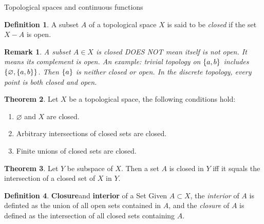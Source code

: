 \documentclass{report}
\let\emptyset\varnothing
\newtheorem*{remark}{Remark}
\theoremstyle{definition}
\newtheorem{theorem}{Theorem}[chapter]
\newtheorem{definition}[theorem]{Definition}
\newcommand{\defn}[1]{\textbf{#1}\label{#1}\index{#1}}
\newcommand{\set}[1]{\ensuremath\left\{#1\right\}}
\begin{document}
\begin{chapter}{Topological spaces and continuous functions}
\begin{definition}
    A subset $A$ of a topological space $X$ is said to be
    \emph{closed} if the set $X-A$ is open.
  \end{definition}
  \begin{remark}
    A subset $A\in X$ is closed DOES NOT mean itself is not open. It
    means its complement is open. An example: trivial topology on
    $\set{a,b}$ includes $\set{\emptyset, \set{a,b}}$. Then $\set{a}$
    is neither closed or open. In the discrete topology, every point
    is both closed and open.
  \end{remark}
  \begin{theorem} Let $X$ be a topological space, the following
    conditions hold:
    \begin{enumerate}
    \item $\emptyset$ and $X$ are closed.
    \item Arbitrary intersections of closed sets are closed.
    \item Finite unions of closed sets are closed.
    \end{enumerate}
  \end{theorem}
  \begin{theorem}
    Let $Y$ be subspace of $X$. Then a set $A$ is closed in $Y$ iff it
    squals the intersection of a closed set of $X$ in $Y$.
  \end{theorem}

  \begin{definition}\defn{Closure} and \defn{interior} of a Set
    Given $A\subset X$, the \emph{interior} of $A$ is definted as the union
    of all open sets contained in $A$, and the \emph{closure} of $A$
    is defined as the intersection of all closed sets containing $A$.


\end{definition}
\end{chapter}
\end{document}
